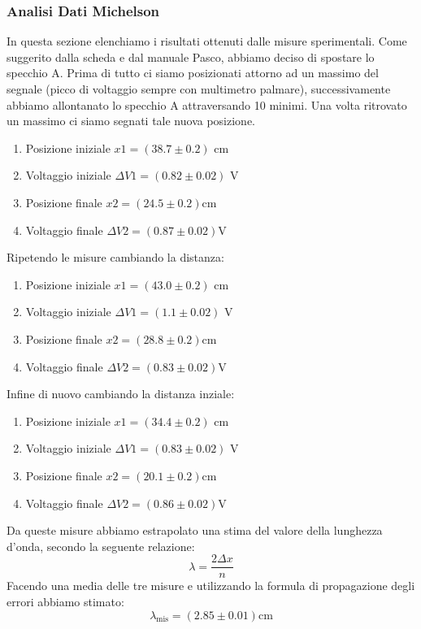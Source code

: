 \documentclass[letterpaper,12pt]{article}
\begin{document}
\subsubsection{Analisi Dati Michelson}
In questa sezione elenchiamo i risultati ottenuti dalle misure sperimentali.
Come suggerito dalla scheda e dal manuale Pasco, abbiamo deciso di spostare lo specchio A. Prima di tutto ci siamo posizionati attorno ad un
massimo del segnale (picco di voltaggio sempre con multimetro palmare), successivamente abbiamo allontanato lo specchio A attraversando 10 minimi. Una volta ritrovato un massimo ci siamo segnati tale nuova posizione.
\begin{enumerate}
	\item Posizione iniziale $x1 =(38.7 \pm0.2)$ cm
	\item Voltaggio iniziale $\Delta V1 = (0.82\pm0.02)$ V 
	\item Posizione finale $x2 =(24.5 \pm0.2)$cm
	\item Voltaggio finale $\Delta V2 = (0.87\pm0.02)$V
\end{enumerate}
Ripetendo le misure cambiando la distanza:
\begin{enumerate}
	\item Posizione iniziale $x1 =(43.0\pm0.2)$ cm
	\item Voltaggio iniziale $\Delta V1 = (1.1\pm0.02)$ V 
	\item Posizione finale $x2 =(28.8\pm0.2)$cm
	\item Voltaggio finale $\Delta V2 = (0.83\pm0.02)$V
\end{enumerate}
Infine di nuovo cambiando la distanza inziale:
\begin{enumerate}
	\item Posizione iniziale $x1 =(34.4\pm0.2)$ cm
	\item Voltaggio iniziale $\Delta V1 = (0.83\pm0.02)$ V 
	\item Posizione finale $x2 =(20.1\pm0.2)$cm
	\item Voltaggio finale $\Delta V2 = (0.86\pm0.02)$V
\end{enumerate}
Da queste misure abbiamo estrapolato una stima del valore della lunghezza d'onda, secondo la seguente relazione:
$$ \lambda = \frac{2\Delta x}{n} $$ 
Facendo una media delle tre misure e utilizzando la formula di propagazione degli errori abbiamo stimato:
$$\lambda_\text{mis} = (2.85 \pm0.01)\text{cm}$$
\end{document}
